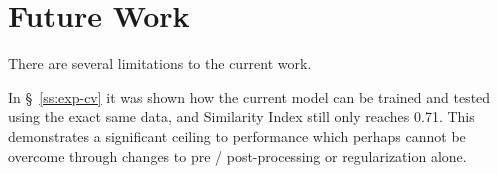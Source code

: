 \section{Future Work}


There are several limitations to the current work.

In \S~\ref{ss:exp-cv} it was shown how the current model
can be trained and tested using the exact same data,
and Similarity Index still only reaches 0.71.
This demonstrates a significant ceiling to performance
which perhaps cannot be overcome through
changes to pre / post-processing or regularization alone.


%


